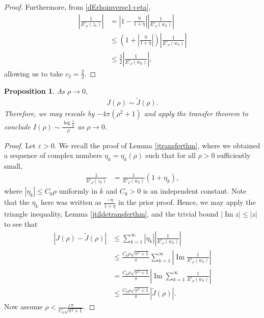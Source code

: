 \documentclass{amsart}
\theoremstyle{plain}
\numberwithin{theorem}{section}
\newtheorem{prop}[theorem]{Proposition}
\DeclareMathOperator{\Imz}{Im}
\theoremstyle{definition}
\theoremstyle{remark}
\theoremstyle{brakets}
\newcommand{\vep}{\varepsilon}
\begin{document}
\begin{proof}
Furthermore, from \eqref{dErhoinverse1+eta},
\begin{align*}
\left| \frac{1}{E'_\rho(z_k)} \right| &= \left| 1 - \frac{\eta}{1+\eta} \right|\left| \frac{1}{E'_\rho(w_k)} \right|\\
&\leq \left(1 + \left|\frac{\eta}{1+\eta}\right| \right) \left| \frac{1}{E'_\rho(w_k)} \right| \\
&\leq \frac{3}{2}\left|\frac{1}{E'_\rho(w_k)} \right|,
\end{align*}
allowing us to take $c_2 = \frac{2}{3}$.
\end{proof}

\begin{prop}\label{Jasymptotics}
    As $\rho \to 0,$
    \begin{align*}
        J(\rho) \sim \tilde{J}(\rho).
    \end{align*}
 Therefore, we may rescale by $-4\pi(\rho^2 + 1)$ and apply the transfer theorem to conclude $I(\rho) \sim \frac{\log \frac{1}{\rho}}{\rho}$ as $\rho \to 0$.
\end{prop}

\begin{proof}
Let $\vep > 0$. We recall the proof of Lemma \ref{jtransferthm}, where we obtained a sequence of complex numbers $\eta_k = \eta_k(\rho)$ such that for all $\rho > 0$ sufficiently small,
\begin{align*}
    \frac{1}{E'_\rho(z_k)} &= \frac{1}{E'_\rho(w_k)}(1 + \eta_k),
\end{align*}
where $|\eta_k| \leq C_0\rho$ uniformly in $k$ and $C_0 > 0$ is an independent constant. Note that the $\eta_k$ here was written as $\frac{-\eta}{1+\eta}$ in the prior proof. Hence, we may apply the triangle inequality, Lemma \ref{jtildetransferthm}, and the trivial bound $|\Imz z| \leq |z|$ to see that
\begin{align*}
    |J(\rho) - \tilde{J}(\rho)| &\leq \sum\limits_{k=1}^{\infty} |\eta_k| \left| \frac{1}{E'_\rho(w_k)} \right| \\
    &\leq \frac{C_0 \rho\sqrt{\pi^2 + 1}}{\pi}  \sum\limits_{k=1}^\infty \left| \Imz \frac{1}{E'_\rho(w_k)} \right| \\
    &= \frac{C_0 \rho\sqrt{\pi^2 + 1}}{\pi}  \left| \Imz \sum\limits_{k=1}^{\infty} \frac{1}{E'_\rho(w_k)}\right| \\
    &\leq \frac{C_0 \rho\sqrt{\pi^2 + 1}}{\pi} |\tilde{J}(\rho)|.
\end{align*}
Now assume $\rho < \frac{\vep \pi}{C_0\sqrt{\pi^2 + 1}}$.
\end{proof}
\end{document}
